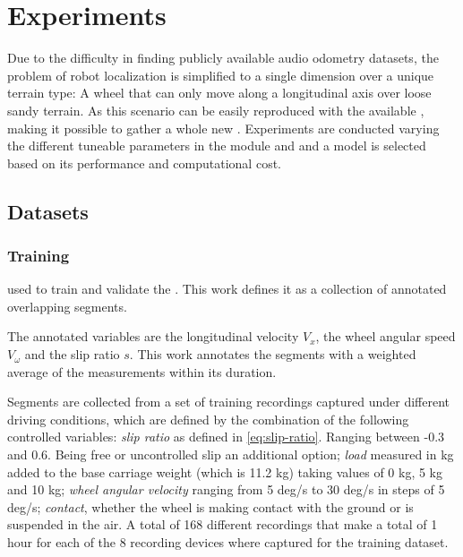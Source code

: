 \section{Experiments} \label{sec:experiments}

Due to the difficulty in finding publicly available audio odometry datasets,
the problem of robot localization is simplified to a single dimension over a
unique terrain type: A wheel that can only move along a longitudinal axis over
loose sandy terrain. As this scenario can be easily reproduced with the
available , making it possible to gather a
whole new . Experiments are conducted varying the
different tuneable parameters in the  module
and  and a model is selected based on its
performance and computational cost.



\subsection{Datasets} \label{subsec:datasets}

\subsubsection{Training} \label{subsubsec:training-dataset}
used to train and validate the . This work
defines it as a collection of annotated overlapping segments.

The annotated variables are the longitudinal velocity $V_x$, the wheel angular
speed $V_\omega$ and the slip ratio $s$. This work annotates the segments with
a weighted average of the measurements within its duration.


Segments are collected from a set of training recordings captured under
different driving conditions, which are defined by the combination of the
following controlled variables: \emph{slip ratio} as defined in
\cref{eq:slip-ratio}. Ranging between -0.3 and 0.6. Being free or uncontrolled
slip an additional option; \emph{load} measured in kg added to the base
carriage weight (which is 11.2 kg) taking values of 0 kg, 5 kg and 10 kg;
\emph{wheel angular velocity} ranging from 5 deg/s to 30 deg/s in steps of 5
deg/s; \emph{contact}, whether the wheel is making contact with the ground or
is suspended in the air. A total of 168 different recordings that make a total
of 1 hour for each of the 8 recording devices where captured for the training
dataset.

